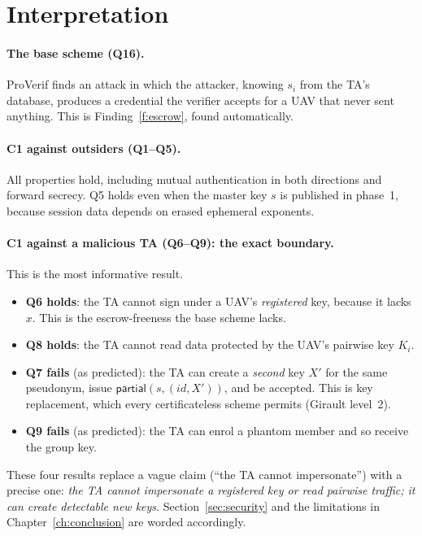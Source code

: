 \section{Interpretation}
\paragraph{The base scheme (Q16).} ProVerif finds an attack in which the attacker, knowing $s_i$ from the TA's database, produces a credential the
verifier accepts for a UAV that never sent anything. This is Finding~\ref{f:escrow}, found automatically.

\paragraph{C1 against outsiders (Q1--Q5).} All properties hold, including mutual authentication in both directions and forward secrecy. Q5 holds even
when the master key $s$ is published in phase~1, because session data depends on erased ephemeral exponents.

\paragraph{C1 against a malicious TA (Q6--Q9): the exact boundary.} This is the most informative result.
\begin{itemize}
  \item \textbf{Q6 holds}: the TA cannot sign under a UAV's \emph{registered} key, because it lacks $x$. This is the escrow-freeness the base scheme lacks.
  \item \textbf{Q8 holds}: the TA cannot read data protected by the UAV's pairwise key $K_i$.
  \item \textbf{Q7 fails} (as predicted): the TA can create a \emph{second} key $X'$ for the same pseudonym, issue $\mathsf{partial}(s,(\mathit{id},X'))$, and be
        accepted. This is key replacement, which every certificateless scheme permits (Girault level~2).
  \item \textbf{Q9 fails} (as predicted): the TA can enrol a phantom member and so receive the group key.
\end{itemize}
These four results replace a vague claim (``the TA cannot impersonate'') with a precise one: \emph{the TA cannot impersonate a registered key or read pairwise
traffic; it can create detectable new keys}. Section~\ref{sec:security} and the limitations in Chapter~\ref{ch:conclusion} are worded accordingly.

